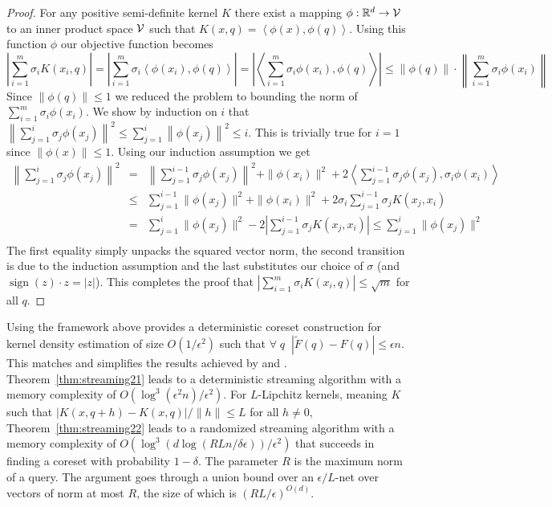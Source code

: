 \documentclass[12pt]{colt2019} %
\newcommand{\ip}[1]{\left \langle #1 \right \rangle}
\newcommand{\R}{\mathbb{R}}
\newcommand{\eps}{\epsilon}
\begin{document}
{\begin{proof}
For any positive semi-definite kernel $K$ there exist a mapping $\phi: \R^d \to {\cal V}$ to an inner product space $\cal V$ such that 
$ K(x,q) = \ip{\phi(x), \phi(q)} $.
Using this function $\phi$ our objective function becomes
\[
|\sum_{i=1}^m \sigma_i K(x_i,q)| = |\sum_{i=1}^m \sigma_i \ip{\phi(x_i), \phi(q)} | = \left| \ip{ \sum_{i=1}^m \sigma_i \phi(x_i), \phi(q)}\right| \leq  \|\phi(q)\| \cdot \left\|  \sum_{i=1}^m \sigma_i \phi(x_i) \right\| 
\]
Since $\|\phi(q)\| \leq 1$ we reduced the problem to bounding the norm of $ \sum_{i=1}^m \sigma_i \phi(x_i) $.
%
We show by induction on $i$ that 
$\left\| \sum_{j=1}^i \sigma_j \phi(x_j) \right\|^2 \le \sum_{j=1}^i \left\|\phi(x_j)\right\|^2 \leq i$.
This is trivially true for $i=1$ since $\|\phi(x)\| \leq 1$. 
Using our induction assumption we get
\begin{eqnarray*}
\left\| \sum_{j=1}^{i}\sigma_j \phi(x_j)\right\|^2 &=& \left\|\sum_{j=1}^{i-1}\sigma_j \phi(x_j)\right\|^2 + \|\phi(x_i)\|^2 + 2\ip{ \sum_{j=1}^{i-1}\sigma_j \phi(x_j), \sigma_i \phi(x_i)} \\
&\le& \sum_{j=1}^{i-1} \|\phi(x_j)\|^2 + \|\phi(x_i)\|^2 + 2\sigma_i \sum_{j=1}^{i-1}\sigma_j K(x_j, x_i)\\
&=& \sum_{j=1}^{i} \|\phi(x_j)\|^2 - 2\left| \sum_{j=1}^{i-1}\sigma_j K(x_j, x_i) \right| \le \sum_{j=1}^{i} \|\phi(x_j)\|^2 \\
\end{eqnarray*}
The first equality simply unpacks the squared vector norm, the second transition is due to the induction assumption and the last substitutes our choice of 
$\sigma$ (and $\operatorname{sign}(z)\cdot z =  |z|$). This completes the proof that $|\sum_{i=1}^m \sigma_i K(x_i,q)| \le \sqrt{m}$ for all $q$.
\end{proof}

Using the framework above provides a deterministic coreset construction for kernel density estimation of size $O(1/\eps^2)$ such that $\forall \;q\;\; |\tilde F(q) - F(q)| \le \eps n$. This matches and simplifies the results achieved by \cite{DBLP:conf/soda/PhillipsT18} and \cite{DBLP:journals/corr/abs-1802-01751}. Theorem~\ref{thm:streaming21} leads to a deterministic streaming algorithm with a memory complexity of $O(\log^3(\eps^2 n)/\eps^2)$. For $L$-Lipchitz kernels, meaning $K$ such that $|K(x,q+h) - K(x,q)|/\|h\| \leq L$ for all $h \neq 0$, Theorem~\ref{thm:streaming22} leads to a randomized streaming algorithm with a memory complexity of $O\left(\log^3 \left( d \log\left(RLn/\delta\eps\right) \right) / \eps^2 \right)$ that succeeds in finding a coreset with probability $1-\delta$. The parameter $R$ is the maximum norm of a query. The argument goes through a union bound over an $\eps/L$-net over vectors of norm at most $R$, the size of which is $(RL/\eps)^{O(d)}$.

}
\end{document}
